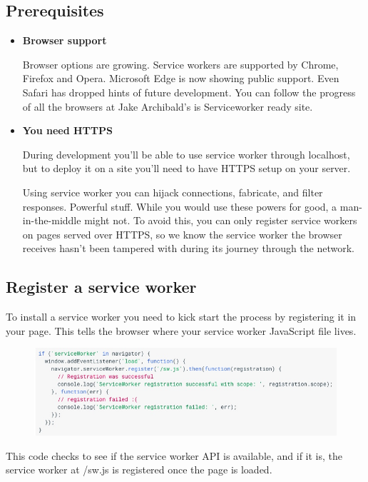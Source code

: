 \documentclass[14pt,a4paper,final]{extreport}
\begin{document}
\subsection{Prerequisites}
\begin{itemize}
    \item \textbf{Browser support}

Browser options are growing. Service workers are supported by Chrome, Firefox and Opera. Microsoft Edge is now showing public support. Even Safari has dropped hints of future development. You can follow the progress of all the browsers at Jake Archibald's is Serviceworker ready site.

\item \textbf{You need HTTPS}

During development you'll be able to use service worker through localhost, but to deploy it on a site you'll need to have HTTPS setup on your server.

Using service worker you can hijack connections, fabricate, and filter responses. Powerful stuff. While you would use these powers for good, a man-in-the-middle might not. To avoid this, you can only register service workers on pages served over HTTPS, so we know the service worker the browser receives hasn't been tampered with during its journey through the network.
\end{itemize}
\subsection{Register a service worker}
\item To install a service worker you need to kick start the process by registering it in your page. This tells the browser where your service worker JavaScript file lives.
\begin{figure}[h]
		\includegraphics[scale=.6]{s1.jpeg}
	
    
\end{figure}
\item This code checks to see if the service worker API is available, and if it is, the service worker at /sw.js is registered once the page is loaded.
\end{document}
